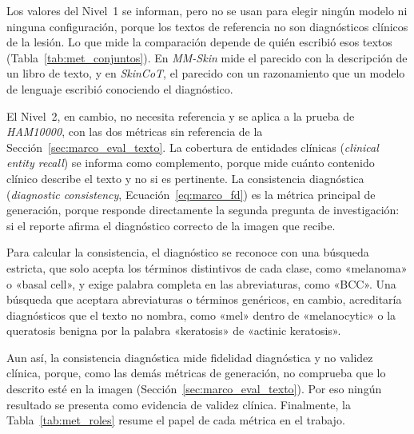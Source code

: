 Los valores del Nivel~1 se informan, pero no se usan para elegir ningún modelo ni ninguna configuración, porque los
textos de referencia no son diagnósticos clínicos de la lesión. Lo que mide la comparación depende de quién escribió
esos textos (Tabla~\ref{tab:met_conjuntos}). En \emph{MM-Skin} mide el parecido con la descripción de un libro de
texto, y en \emph{SkinCoT}, el parecido con un razonamiento que un modelo de lenguaje escribió conociendo el
diagnóstico.

El Nivel~2, en cambio, no necesita referencia y se aplica a la prueba de \emph{HAM10000}, con las dos métricas sin
referencia de la Sección~\ref{sec:marco_eval_texto}. La cobertura de entidades clínicas (\emph{clinical entity
recall}) se informa como complemento, porque mide cuánto contenido clínico describe el texto y no si es pertinente. La
consistencia diagnóstica (\emph{diagnostic consistency}, Ecuación~\ref{eq:marco_fd}) es la métrica principal de
generación, porque responde directamente la segunda pregunta de investigación: si el reporte afirma el diagnóstico
correcto de la imagen que recibe.

Para calcular la consistencia, el diagnóstico se reconoce con una búsqueda estricta, que solo acepta los términos
distintivos de cada clase, como «melanoma» o «basal cell», y exige palabra completa en las abreviaturas, como «BCC».
Una búsqueda que aceptara abreviaturas o términos genéricos, en cambio, acreditaría diagnósticos que el texto no
nombra, como «mel» dentro de «melanocytic» o la queratosis benigna por la palabra «keratosis» de «actinic keratosis».

Aun así, la consistencia diagnóstica mide fidelidad diagnóstica y no validez clínica, porque, como las demás métricas
de generación, no comprueba que lo descrito esté en la imagen (Sección~\ref{sec:marco_eval_texto}). Por eso ningún
resultado se presenta como evidencia de validez clínica. Finalmente, la Tabla~\ref{tab:met_roles} resume el papel de
cada métrica en el trabajo.

